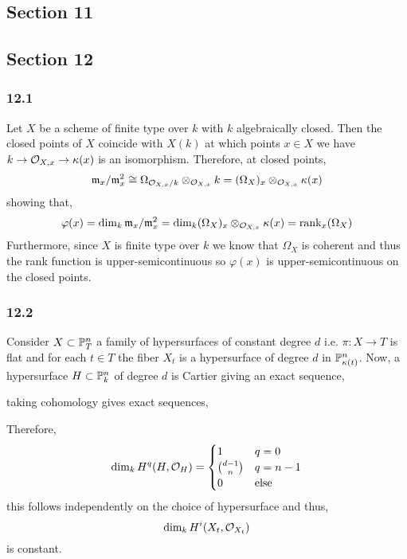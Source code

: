 \documentclass[12pt]{article}
\begin{document}
\subsection{Section 11}

\subsection{Section 12}

\subsubsection{12.1}

Let $X$ be a scheme of finite type over $k$ with $k$ algebraically closed. Then the closed points of $X$ coincide with $X(k)$ at which points $x \in X$ we have $k \to \stalk{X}{x} \to \kappa(x)$ is an isomorphism. Therefore, at closed points,
\[ \m_x / \m_x^2 \cong \Omega_{\stalk{X}{x}/k} \otimes_{\stalk{X}{x}} k = (\Omega_X)_x \otimes_{\stalk{X}{x}} \kappa(x) \]
showing that,
\[ \varphi(x) = \dim_k \m_x / \m_x^2 = \dim_k(\Omega_X)_x \otimes_{\stalk{X}{x}} \kappa(x) = \rank_x{(\Omega_X)} \]
Furthermore, since $X$ is finite type over $k$ we know that $\Omega_X$ is coherent and thus the rank function is upper-semicontinuous so $\varphi(x)$ is upper-semicontinuous on the closed points.

\subsubsection{12.2}

Consider $X \subset \P^n_T$ a family of hypersurfaces of constant degree $d$ i.e. $\pi : X \to T$ is flat and for each $t \in T$ the fiber $X_t$ is a hypersurface of degree $d$ in $\P^n_{\kappa(t)}$. Now, a hypersurface $H \subset \P^n_k$ of degree $d$ is Cartier giving an exact sequence,
\begin{center}
\end{center}
taking cohomology gives exact sequences,
\begin{center}
\end{center}
Therefore,
\[ \dim_k H^{q}(H, \struct{H}) = \begin{cases}
1 & q = 0
\\
{d - 1 \choose n } & q = n-1
\\
0 & \text{else}
\end{cases} \] 
this follows independently on the choice of hypersurface and thus,
\[ \dim_k H^i(X_t, \struct{X_t}) \]
is constant.
\end{document}
